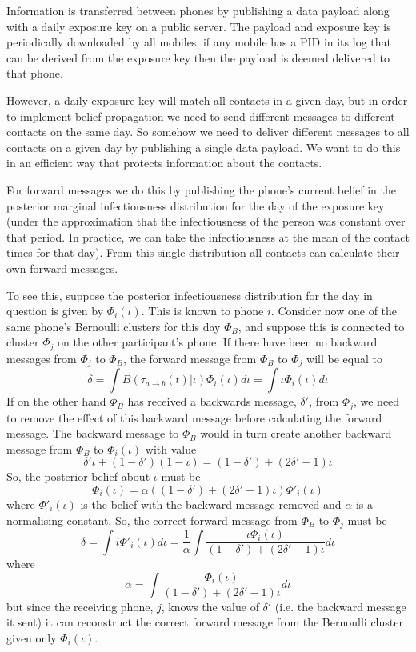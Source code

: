 \documentclass{article}
\begin{document}
Information is transferred between phones by publishing a data payload along with a daily exposure key on a public server. The payload and exposure key is periodically downloaded by all mobiles, if any mobile has a PID in its log that can be derived from the exposure key then the payload is deemed delivered to that phone.

However, a daily exposure key will match all contacts in a given day, but in order to implement belief propagation we need to send different messages to different contacts on the same day. So somehow we need to deliver different messages to all contacts on a given day by publishing a single data payload. We want to do this in an efficient way that protects information about the contacts.

For forward messages we do this by publishing the phone's current belief in the posterior marginal infectiousness distribution for the day of the exposure key (under the approximation that the infectiousness of the person was constant over that period. In practice, we can take the infectiousness at the mean of the contact times for that day). From this single distribution all contacts can calculate their own forward messages.

To see this, suppose the posterior infectiousness distribution for the day in question is given by $\Phi_i(\iota)$. This is known to phone $i$. Consider now one of the same phone's Bernoulli clusters for this day $\Phi_{B}$, and suppose this is connected to cluster $\Phi_j$ on the other participant's phone. If there have been no backward messages from $\Phi_j$ to $\Phi_{B}$, the forward message from $\Phi_{B}$ to $\Phi_j$ will be equal to
\[
\delta = \int B(\tau_{a\rightarrow b}(t)|\iota)\Phi_i(\iota) d\iota = \int \iota\Phi_i(\iota) d\iota
\]
If on the other hand $\Phi_{B}$ has received a backwards message, $\delta'$,  from $\Phi_j$, we need to remove the effect of this backward message before calculating the forward message. The backward message to $\Phi_{B}$ would in turn create another backward message from $\Phi_{B}$ to $\Phi_i(\iota)$ with value
\[
\delta'\iota + (1-\delta')(1-\iota) = (1 - \delta') + (2\delta' - 1)\iota
\]
So, the posterior belief about $\iota$ must be
\[
\Phi_i(\iota) = \alpha((1 - \delta') + (2\delta' - 1)\iota)\Phi'_i(\iota)
\]
where $\Phi'_i(\iota)$ is the belief with the backward message removed and $\alpha$ is a normalising constant. So, the correct forward message from $\Phi_{B}$ to $\Phi_j$ must be
\begin{equation}
\delta = \int i \Phi'_i(\iota) d\iota = \frac{1}{\alpha}\int \frac{\iota\Phi_i(\iota)}{(1 - \delta') + (2\delta' - 1)\iota} d\iota
\label{forwardMessage}
\end{equation}
where
\begin{equation}
\alpha = \int \frac{\Phi_i(\iota)}{(1 - \delta') + (2\delta' - 1)\iota} d\iota
\label{normalisation}
\end{equation}
but since the receiving phone, $j$, knows the value of $\delta'$ (i.e. the backward message it sent) it can reconstruct the correct forward message from the Bernoulli cluster given only $\Phi_i(\iota)$.
\end{document}
